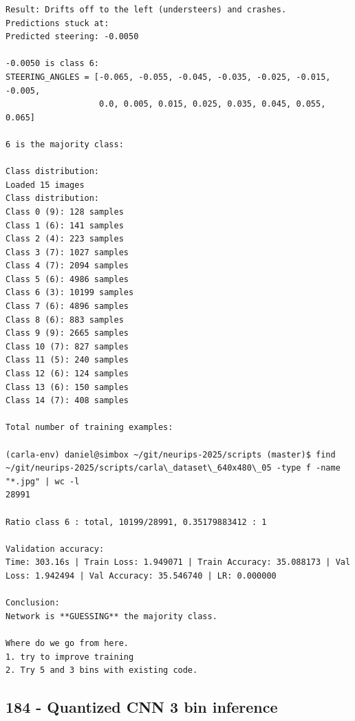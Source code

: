 \begin{verbatim}
Result: Drifts off to the left (understeers) and crashes.
Predictions stuck at:
Predicted steering: -0.0050

-0.0050 is class 6:
STEERING_ANGLES = [-0.065, -0.055, -0.045, -0.035, -0.025, -0.015, -0.005,
                   0.0, 0.005, 0.015, 0.025, 0.035, 0.045, 0.055, 0.065]

6 is the majority class:

Class distribution:
Loaded 15 images
Class distribution:
Class 0 (9): 128 samples
Class 1 (6): 141 samples
Class 2 (4): 223 samples
Class 3 (7): 1027 samples
Class 4 (7): 2094 samples
Class 5 (6): 4986 samples
Class 6 (3): 10199 samples
Class 7 (6): 4896 samples
Class 8 (6): 883 samples
Class 9 (9): 2665 samples
Class 10 (7): 827 samples
Class 11 (5): 240 samples
Class 12 (6): 124 samples
Class 13 (6): 150 samples
Class 14 (7): 408 samples

Total number of training examples:

(carla-env) daniel@simbox ~/git/neurips-2025/scripts (master)$ find ~/git/neurips-2025/scripts/carla\_dataset\_640x480\_05 -type f -name "*.jpg" | wc -l
28991

Ratio class 6 : total, 10199/28991, 0.35179883412 : 1

Validation accuracy: 
Time: 303.16s | Train Loss: 1.949071 | Train Accuracy: 35.088173 | Val Loss: 1.942494 | Val Accuracy: 35.546740 | LR: 0.000000

Conclusion: 
Network is **GUESSING** the majority class.

Where do we go from here.
1. try to improve training
2. Try 5 and 3 bins with existing code.

\end{verbatim}

\subsection{184 - Quantized CNN 3 bin inference}
\label{app_res:184}

